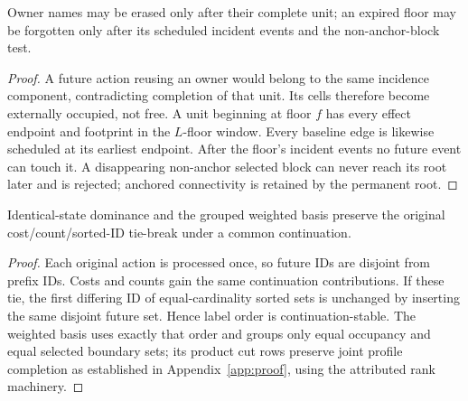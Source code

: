 \begin{lemma}\label{lem:r2-forget}
Owner names may be erased only after their complete unit; an expired floor may
be forgotten only after its scheduled incident events and the non-anchor-block
test.
\end{lemma}
\begin{proof}
A future action reusing an owner would belong to the same incidence component,
contradicting completion of that unit. Its cells therefore become externally
occupied, not free. A unit beginning at floor $f$ has every effect endpoint and
footprint in the $L$-floor window. Every baseline edge is likewise scheduled at
its earliest endpoint. After the floor's incident events no future event can
touch it. A disappearing non-anchor selected block can never reach its root
later and is rejected; anchored connectivity is retained by the permanent root.
\end{proof}

\begin{lemma}\label{lem:r2-label}
Identical-state dominance and the grouped weighted basis preserve the original
cost/count/sorted-ID tie-break under a common continuation.
\end{lemma}
\begin{proof}
Each original action is processed once, so future IDs are disjoint from prefix
IDs. Costs and counts gain the same continuation contributions. If these tie,
the first differing ID of equal-cardinality sorted sets is unchanged by inserting
the same disjoint future set. Hence label order is continuation-stable. The
weighted basis uses exactly that order and groups only equal occupancy and equal
selected boundary sets; its product cut rows preserve joint profile completion
as established in Appendix~\ref{app:proof}, using the attributed rank machinery.
\end{proof}

